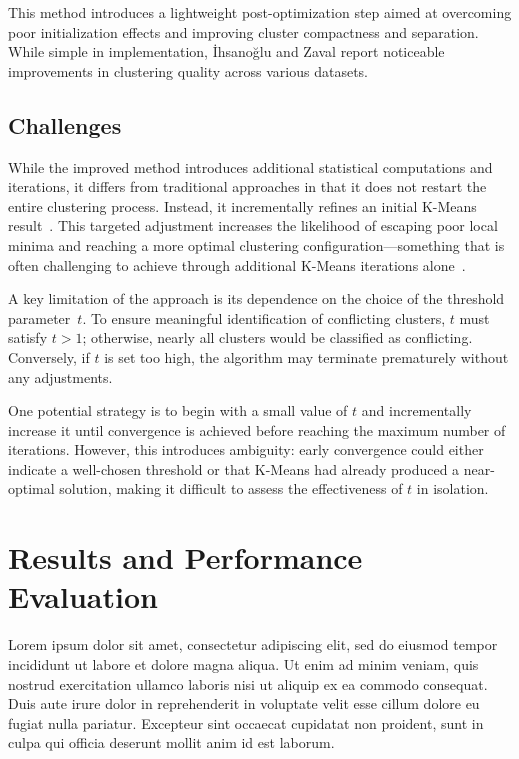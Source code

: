 \documentclass[10pt,twocolumn,letterpaper]{article}
\begin{document}
This method introduces a lightweight post-optimization step aimed at overcoming
poor initialization effects and improving cluster compactness and separation.
While simple in implementation, İhsanoğlu and Zaval report noticeable
improvements in clustering quality across various datasets.


\subsection{Challenges}\label{subsec:challenges}

While the improved method introduces additional statistical computations and
iterations, it differs from traditional approaches in that it does not restart
the entire clustering process. Instead, it incrementally refines an initial
K-Means result~\cite{Abdullah10601123}. This targeted adjustment increases the
likelihood of escaping poor local minima and reaching a more optimal clustering
configuration—something that is often challenging to achieve through additional
K-Means iterations alone~\cite{FRANTI201995}.

A key limitation of the approach is its dependence on the choice of the
threshold parameter~$t$. To ensure meaningful identification of conflicting
clusters, $t$ must satisfy $t > 1$; otherwise, nearly all clusters would be
classified as conflicting. Conversely, if $t$ is set too high, the algorithm
may terminate prematurely without any adjustments.

One potential strategy is to begin with a small value of $t$ and incrementally
increase it until convergence is achieved before reaching the maximum number of
iterations. However, this introduces ambiguity: early convergence could either
indicate a well-chosen threshold or that K-Means had already produced a
near-optimal solution, making it difficult to assess the effectiveness of $t$
in isolation.


\section{Results and Performance Evaluation}\label{sec:results-and-performance-evaluation}

Lorem ipsum dolor sit amet, consectetur adipiscing elit, sed do eiusmod tempor
incididunt ut labore et dolore magna aliqua. Ut enim ad minim veniam, quis
nostrud exercitation ullamco laboris nisi ut aliquip ex ea commodo consequat.
Duis aute irure dolor in reprehenderit in voluptate velit esse cillum dolore eu
fugiat nulla pariatur. Excepteur sint occaecat cupidatat non proident, sunt in
culpa qui officia deserunt mollit anim id est laborum.
\end{document}

